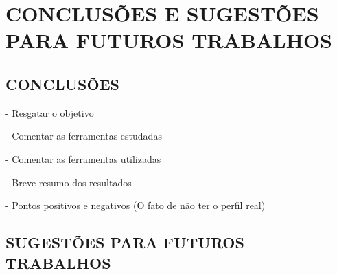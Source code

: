 \chapter{CONCLUSÕES E SUGESTÕES PARA FUTUROS TRABALHOS}\label{ch:conclusao}
\section{CONCLUSÕES} 
- Resgatar o objetivo

- Comentar as ferramentas estudadas

- Comentar as ferramentas utilizadas

- Breve resumo dos resultados

- Pontos positivos e negativos (O fato de não ter o perfil real)


\section{SUGESTÕES PARA FUTUROS TRABALHOS}

%

